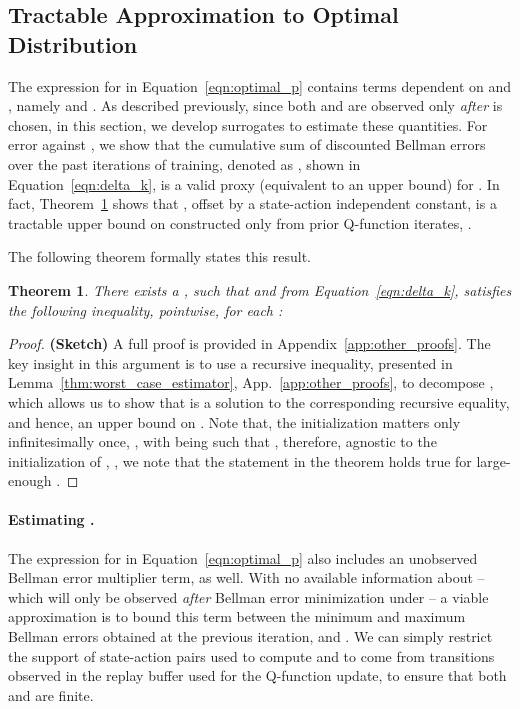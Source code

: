 \documentclass[jmlr]{article}
\newtheorem{theorem}{Theorem}[section]
\begin{document}
\vspace{-5pt}
\subsection{Tractable Approximation to Optimal Distribution}
\label{sec:minimax}
\vspace{-2pt}
The expression for  in Equation~\ref{eqn:optimal_p} contains terms dependent on  and , namely  and . As described previously, since both  and  are observed only \emph{after}  is chosen, in this section, we develop surrogates to estimate these quantities. For error against , we show that the cumulative sum of discounted Bellman errors over the past iterations of training, denoted as , shown in Equation~\ref{eqn:delta_k}, is a valid proxy (equivalent to an upper bound) for . In fact, Theorem~\ref{thm:delta_k_upper_bound} shows that , offset by a state-action independent constant, is a tractable upper bound on  constructed only from prior Q-function iterates, . 
\vspace{-2pt}

The following theorem formally states this result. 
\begin{theorem}
\label{thm:delta_k_upper_bound}
There exists a , such that   and  from Equation~\ref{eqn:delta_k},  satisfies the following inequality, pointwise, for each :
\vspace{-10pt}

\end{theorem}
\begin{proof}
\textbf{(Sketch)} A full proof is provided in Appendix~\ref{app:other_proofs}. The key insight in this argument is to use a recursive inequality, presented in Lemma~\ref{thm:worst_case_estimator}, App.~\ref{app:other_proofs}, to decompose , which allows us to show that  is a solution to the corresponding recursive equality, and hence, an upper bound on . Note that, the initialization  matters only infinitesimally once, , with  being such that , therefore, agnostic to the initialization of , , we note that the statement in the theorem holds true for large-enough . 
\end{proof}

\paragraph{Estimating .} The expression for  in Equation~\ref{eqn:optimal_p} also includes an unobserved Bellman error multiplier term,  as well. With no available information about  -- which will only be observed \textit{after} Bellman error minimization under  -- a viable approximation is to bound this term  between the minimum and maximum Bellman errors obtained at the previous iteration,  and . We can simply restrict the support of state-action pairs  used to compute  and  to come from transitions observed in the replay buffer used for the Q-function update, to ensure that both  and  are finite. 
\end{document}
